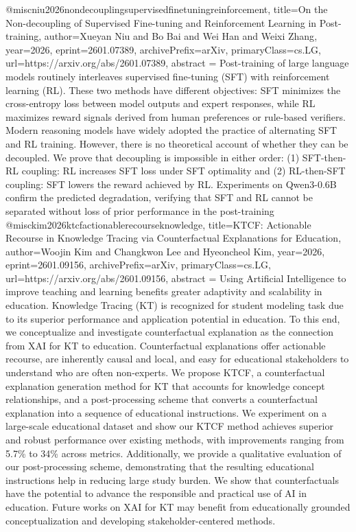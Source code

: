 {}@misc{niu2026nondecouplingsupervisedfinetuningreinforcement,
      title={On the Non-decoupling of Supervised Fine-tuning and Reinforcement Learning in Post-training}, 
      author={Xueyan Niu and Bo Bai and Wei Han and Weixi Zhang},
      year={2026},
      eprint={2601.07389},
      archivePrefix={arXiv},
      primaryClass={cs.LG},
      url={https://arxiv.org/abs/2601.07389},
      abstract = {Post-training of large language models routinely interleaves supervised fine-tuning (SFT) with reinforcement learning (RL). These two methods have different objectives: SFT minimizes the cross-entropy loss between model outputs and expert responses, while RL maximizes reward signals derived from human preferences or rule-based verifiers. Modern reasoning models have widely adopted the practice of alternating SFT and RL training. However, there is no theoretical account of whether they can be decoupled. We prove that decoupling is impossible in either order: (1) SFT-then-RL coupling: RL increases SFT loss under SFT optimality and (2) RL-then-SFT coupling: SFT lowers the reward achieved by RL. Experiments on Qwen3-0.6B confirm the predicted degradation, verifying that SFT and RL cannot be separated without loss of prior performance in the post-training}
}@misc{kim2026ktcfactionablerecourseknowledge,
      title={KTCF: Actionable Recourse in Knowledge Tracing via Counterfactual Explanations for Education}, 
      author={Woojin Kim and Changkwon Lee and Hyeoncheol Kim},
      year={2026},
      eprint={2601.09156},
      archivePrefix={arXiv},
      primaryClass={cs.LG},
      url={https://arxiv.org/abs/2601.09156},
      abstract = {Using Artificial Intelligence to improve teaching and learning benefits greater adaptivity and scalability in education. Knowledge Tracing (KT) is recognized for student modeling task due to its superior performance and application potential in education. To this end, we conceptualize and investigate counterfactual explanation as the connection from XAI for KT to education. Counterfactual explanations offer actionable recourse, are inherently causal and local, and easy for educational stakeholders to understand who are often non-experts. We propose KTCF, a counterfactual explanation generation method for KT that accounts for knowledge concept relationships, and a post-processing scheme that converts a counterfactual explanation into a sequence of educational instructions. We experiment on a large-scale educational dataset and show our KTCF method achieves superior and robust performance over existing methods, with improvements ranging from 5.7\% to 34\% across metrics. Additionally, we provide a qualitative evaluation of our post-processing scheme, demonstrating that the resulting educational instructions help in reducing large study burden. We show that counterfactuals have the potential to advance the responsible and practical use of AI in education. Future works on XAI for KT may benefit from educationally grounded conceptualization and developing stakeholder-centered methods.}
}
